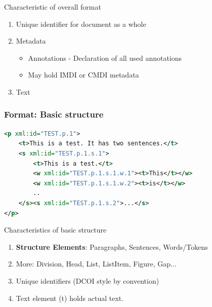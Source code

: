 \documentclass[compress]{beamer}
\begin{document}
\begin{frame}
    \begin{block}{Characteristic of overall format}
      \begin{enumerate}
        \item Unique identifier for document as a whole
        \item Metadata 
        \begin{itemize}
            \item Annotations - Declaration of all used annotations
            \item May hold IMDI or CMDI metadata
        \end{itemize}
        \item Text        
      \end{enumerate}
    \end{block}
\end{frame}



\begin{frame}[fragile]
\frametitle{Format: Basic structure}
\begin{lstlisting}[language=xml]
<p xml:id="TEST.p.1">
    <t>This is a test. It has two sentences.</t>
    <s xml:id="TEST.p.1.s.1">        
        <t>This is a test.</t>
        <w xml:id="TEST.p.1.s.1.w.1"><t>This</t></w>
        <w xml:id="TEST.p.1.s.1.w.2"><t>is</t></w>
        ..
    </s><s xml:id="TEST.p.1.s.2">...</s>                
</p>                
\end{lstlisting}
    
\end{frame}

\begin{frame}
    \begin{block}{Characteristics of basic structure}
      \begin{enumerate}
        \item \textbf{Structure Elements}: Paragraphs, Sentences, Words/Tokens  
        \item More: Division, Head, List, ListItem, Figure, Gap...
        \item Unique identifiers (DCOI style by convention)
        \item Text element (t) holds actual text.
      \end{enumerate}
    \end{block}
\end{frame}
        
        
\end{document}
